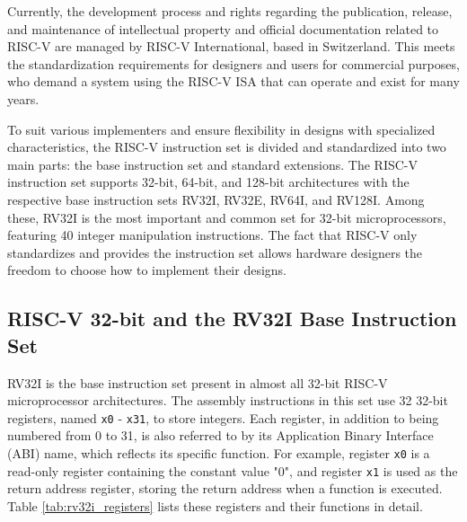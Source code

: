 Currently, the development process and rights regarding the publication, release, and maintenance of intellectual property and official documentation related to RISC-V are managed by RISC-V International, based in Switzerland. This meets the standardization requirements for designers and users for commercial purposes, who demand a system using the RISC-V ISA that can operate and exist for many years.

To suit various implementers and ensure flexibility in designs with specialized characteristics, the RISC-V instruction set is divided and standardized into two main parts: the base instruction set and standard extensions. The RISC-V instruction set supports 32-bit, 64-bit, and 128-bit architectures with the respective base instruction sets RV32I, RV32E, RV64I, and RV128I. Among these, RV32I is the most important and common set for 32-bit microprocessors, featuring 40 integer manipulation instructions. The fact that RISC-V only standardizes and provides the instruction set allows hardware designers the freedom to choose how to implement their designs.

\subsection{RISC-V 32-bit and the RV32I Base Instruction Set}

RV32I \cite{riscv:manual:user:2024} is the base instruction set present in almost all 32-bit RISC-V microprocessor architectures. The assembly instructions in this set use 32 32-bit registers, named \texttt{x0} - \texttt{x31}, to store integers. Each register, in addition to being numbered from 0 to 31, is also referred to by its Application Binary Interface (ABI) name, which reflects its specific function. For example, register \texttt{x0} is a read-only register containing the constant value "0", and register \texttt{x1} is used as the return address register, storing the return address when a function is executed. Table \ref{tab:rv32i_registers} lists these registers and their functions in detail.

